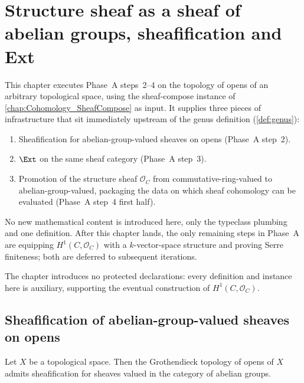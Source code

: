 \chapter{Structure sheaf as a sheaf of abelian groups, sheafification and Ext}
\label{chap:Cohomology_StructureSheafAb}

This chapter executes Phase~A steps~2--4 on the topology of opens of an arbitrary topological space, using the sheaf-compose instance of \cref{chap:Cohomology_SheafCompose} as input. It supplies three pieces of infrastructure that sit immediately upstream of the genus definition (\cref{def:genus}):

\begin{enumerate}
  \item Sheafification for abelian-group-valued sheaves on opens (Phase~A step~2).
  \item \(\Ext\) on the same sheaf category (Phase~A step~3).
  \item Promotion of the structure sheaf \(\mathcal O_C\) from commutative-ring-valued to abelian-group-valued, packaging the data on which sheaf cohomology can be evaluated (Phase~A step~4 first half).
\end{enumerate}

No new mathematical content is introduced here, only the typeclass plumbing and one definition. After this chapter lands, the only remaining steps in Phase~A are equipping \(H^1(C, \mathcal O_C)\) with a \(k\)-vector-space structure and proving Serre finiteness; both are deferred to subsequent iterations.

The chapter introduces no protected declarations: every definition and instance here is auxiliary, supporting the eventual construction of \(H^1(C, \mathcal O_C)\).

\section{Sheafification of abelian-group-valued sheaves on opens}

\begin{theorem}
  \label{thm:HasSheafify_Opens_AddCommGrp}
  Let \(X\) be a topological space. Then the Grothendieck topology of opens of \(X\) admits sheafification for sheaves valued in the category of abelian groups.
\end{theorem}

